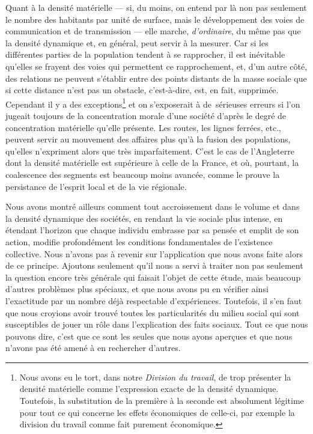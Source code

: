 \documentclass[french,twoside]{book} %
\begin{document}
Quant à la densité matérielle — si, du moins, on entend par là non pas seulement le nombre des habitants par unité de surface, mais le développement des voies de communication et de transmission — elle marche, {\itshape d’ordinaire}, du même pas que la densité dynamique et, en général, peut servir à la mesurer. Car si les différentes parties de la population tendent à se rapprocher, il est inévitable qu’elles se frayent des voies qui permettent ce rapprochement, et, d’un autre côté, des relations ne peuvent s’établir entre des points distants de la masse sociale que si cette distance n’est pas un obstacle, c’est-à-dire, est, en fait, supprimée. Cependant il y a des exceptions\footnote{ Nous avons eu le tort, dans notre \emph{Division du travail}, de trop présenter la densité matérielle comme l’expression exacte de la densité dynamique. Toutefois, la substitution de la première à la seconde est absolument légitime pour tout ce qui concerne les effets économiques de celle-ci, par exemple la division du travail comme fait purement économique.} et on s’exposerait à de sérieuses erreurs si l’on jugeait toujours de la concentration morale d’une société d’après le degré de concentration matérielle qu’elle présente. Les routes, les lignes ferrées, etc., peuvent servir au mouvement des affaires plus qu’à la fusion des populations, qu’elles n’expriment alors que très imparfaitement. C’est le cas de l’Angleterre dont la densité matérielle est supérieure à celle de la France, et où, pourtant, la coalescence des segments est beaucoup moins avancée, comme le prouve la persistance de l’esprit local et de la vie régionale.\par
Nous avons montré ailleurs comment tout accroissement dans le volume et dans la densité dynamique des sociétés, en rendant la vie sociale plus intense, en étendant l’horizon que chaque individu embrasse par sa pensée et emplit de son action, modifie profondément les conditions fondamentales de l’existence collective. Nous n’avons pas à revenir sur l’application que nous avons faite alors de ce principe. Ajoutons seulement qu’il nous a servi à traiter non pas seulement la question encore très générale qui faisait l’objet de cette étude, mais beaucoup d’autres problèmes plus spéciaux, et que nous avons pu en vérifier ainsi l’exactitude par un nombre déjà respectable d’expériences. Toutefois, il s’en faut que nous croyions avoir trouvé toutes les particularités du milieu social qui sont susceptibles de jouer un rôle dans l’explication des faits sociaux. Tout ce que nous pouvons dire, c’est que ce sont les seules que nous ayons aperçues et que nous n’avons pas été amené à en rechercher d’autres.\par
\end{document}
